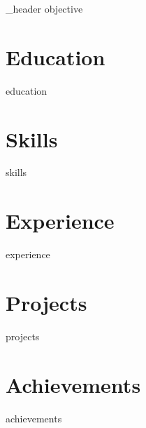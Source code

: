 \documentclass[letter,10pt]{article}
\author{Sunil Kumar Sharma}
\begin{document}
{_header}
{objective}
\section{Education}
{education}
\section{Skills}
{skills}
\section{Experience}
{experience}
\section{Projects}
{projects}
\section{Achievements}
{achievements}
\end{document}
